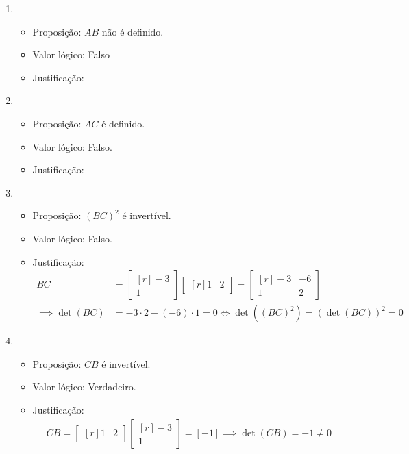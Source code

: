 \begin{enumerate}[label=\alph*)]
	\item
		\begin{itemize}
			\item Proposição: $AB$ não é definido.
			\item Valor lógico: Falso
			\item Justificação:
		\end{itemize}
	\item
		\begin{itemize}
			\item Proposição: $AC$ é definido.
			\item Valor lógico: Falso.
			\item Justificação:
		\end{itemize}
	\item
		\begin{itemize}
			\item Proposição: $(BC)^2$ é invertível.
			\item Valor lógico: Falso.
			\item Justificação:
				\begin{align*}
					BC &=
					\begin{bmatrix*}[r]
						-3\\
						1
					\end{bmatrix*}
					\begin{bmatrix*}[r]
						1  & 2
					\end{bmatrix*}
					=
					\begin{bmatrix*}[r]
						-3 & -6\\
						1 & 2
					\end{bmatrix*}\\
					\implies \det (BC) &= -3 \cdot 2 - (-6)\cdot 1 = 0
					\iff \det((BC)^2) = \left(\det(BC)\right)^2 = 0
				\end{align*}
		\end{itemize}
	\item
		\begin{itemize}
			\item Proposição: $CB$ é invertível.
			\item Valor lógico: Verdadeiro.
			\item Justificação:
				\begin{align*}
					CB =
					\begin{bmatrix*}[r]
						1  & 2
					\end{bmatrix*}
					\begin{bmatrix*}[r]
						-3\\
						1
					\end{bmatrix*}
					=
					[-1] \implies \det (CB) = -1 \neq 0
				\end{align*}
		\end{itemize}
\end{enumerate}

